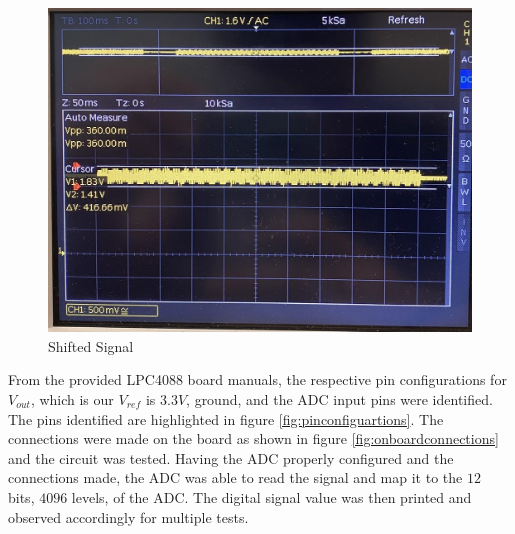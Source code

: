 \documentclass{cce2014-design}
\begin{document}
\vspace{1em}
\begin{figure}[!h]
   \centering
   \includegraphics[width=0.8\linewidth]{signal_shifted.jpg}
   \caption{Shifted Signal}
   \label{fig:signalaftercircuit}
\end{figure}
\vspace{1em}

\newpage

From the provided LPC4088 board manuals, the respective pin configurations for $V_{out}$, which is our $V_{ref}$ is $3.3V$, ground, and the ADC input pins were identified.
The pins identified are highlighted in figure \ref*{fig:pinconfiguartions}.
The connections were made on the board as shown in figure \ref*{fig:onboardconnections} and the circuit was tested.
Having the ADC properly configured and the connections made, the ADC was able to read the signal and map it to the $12$ bits, $4096$ levels, of the ADC.
The digital signal value was then printed and observed accordingly for multiple tests.
\end{document}

